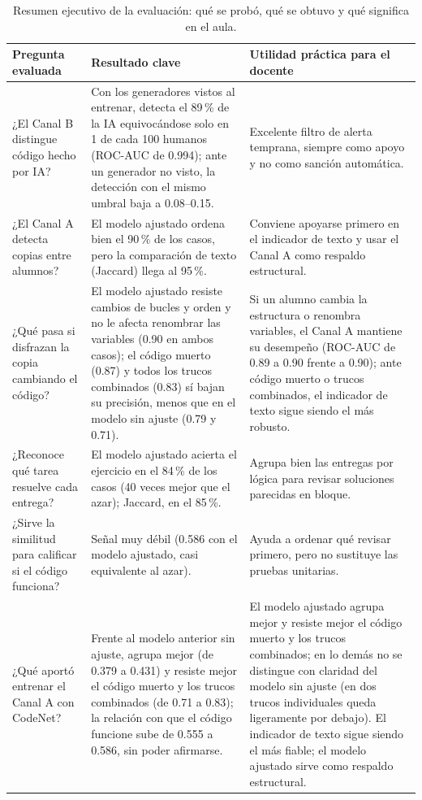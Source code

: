 \begin{table}[H]
    \centering
    \caption{Resumen ejecutivo de la evaluación: qué se probó, qué se obtuvo y qué significa en el aula.}
    \label{tab:hallazgos}
    \renewcommand{\arraystretch}{1.25}
    \small
    \begin{tabularx}{\textwidth}{|>{\raggedright\arraybackslash}p{3.5cm}|>{\raggedright\arraybackslash}X|>{\raggedright\arraybackslash}X|}
        \hline
        \textbf{Pregunta evaluada} & \textbf{Resultado clave} & \textbf{Utilidad práctica para el docente} \\ \hline
        ¿El Canal B distingue código hecho por IA? & Con los generadores vistos al entrenar, detecta el 89\,\% de la IA equivocándose solo en 1 de cada 100 humanos (ROC-AUC de 0.994); ante un generador no visto, la detección con el mismo umbral baja a 0.08--0.15. & Excelente filtro de alerta temprana, siempre como apoyo y no como sanción automática. \\ \hline
        ¿El Canal A detecta copias entre alumnos? & El modelo ajustado ordena bien el 90\,\% de los casos, pero la comparación de texto (Jaccard) llega al 95\,\%. & Conviene apoyarse primero en el indicador de texto y usar el Canal A como respaldo estructural. \\ \hline
        ¿Qué pasa si disfrazan la copia cambiando el código? & El modelo ajustado resiste cambios de bucles y orden y no le afecta renombrar las variables (0.90 en ambos casos); el código muerto (0.87) y todos los trucos combinados (0.83) sí bajan su precisión, menos que en el modelo sin ajuste (0.79 y 0.71). & Si un alumno cambia la estructura o renombra variables, el Canal A mantiene su desempeño (ROC-AUC de 0.89 a 0.90 frente a 0.90); ante código muerto o trucos combinados, el indicador de texto sigue siendo el más robusto. \\ \hline
        ¿Reconoce qué tarea resuelve cada entrega? & El modelo ajustado acierta el ejercicio en el 84\,\% de los casos (40 veces mejor que el azar); Jaccard, en el 85\,\%. & Agrupa bien las entregas por lógica para revisar soluciones parecidas en bloque. \\ \hline
        ¿Sirve la similitud para calificar si el código funciona? & Señal muy débil (0.586 con el modelo ajustado, casi equivalente al azar). & Ayuda a ordenar qué revisar primero, pero no sustituye las pruebas unitarias. \\ \hline
        ¿Qué aportó entrenar el Canal A con CodeNet? & Frente al modelo anterior sin ajuste, agrupa mejor (de 0.379 a 0.431) y resiste mejor el código muerto y los trucos combinados (de 0.71 a 0.83); la relación con que el código funcione sube de 0.555 a 0.586, sin poder afirmarse. & El modelo ajustado agrupa mejor y resiste mejor el código muerto y los trucos combinados; en lo demás no se distingue con claridad del modelo sin ajuste (en dos trucos individuales queda ligeramente por debajo). El indicador de texto sigue siendo el más fiable; el modelo ajustado sirve como respaldo estructural. \\ \hline
    \end{tabularx}
\end{table}

